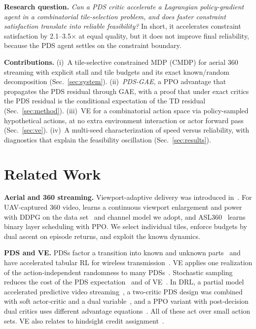 \documentclass[conference]{IEEEtran}
\begin{document}
\textbf{Research question.} \emph{Can a PDS critic accelerate a Lagrangian policy-gradient agent in a combinatorial tile-selection problem, and does faster constraint satisfaction translate into reliable feasibility?} In short, it accelerates constraint satisfaction by 2.1--3.5$\times$ at equal quality, but it does not improve final reliability, because the PDS agent settles on the constraint boundary.

\textbf{Contributions.}
(i)~A tile-selective constrained MDP (CMDP) for aerial 360\textdegree{} streaming with explicit stall and tile budgets and its exact known/random decomposition (Sec.~\ref{sec:system}).
(ii)~\emph{PDS-GAE}, a PPO advantage that propagates the PDS residual through GAE, with a proof that under exact critics the PDS residual is the conditional expectation of the TD residual (Sec.~\ref{sec:method}).
(iii)~VE for a combinatorial action space via policy-sampled hypothetical actions, at no extra environment interaction or actor forward pass (Sec.~\ref{sec:ve}).
(iv)~A multi-seed characterization of speed versus reliability, with diagnostics that explain the feasibility oscillation (Sec.~\ref{sec:results}).

\section{Related Work}

\textbf{Aerial and 360\textdegree{} streaming.} Viewport-adaptive delivery was introduced in~\cite{corbillon2017viewport}. For UAV-captured 360\textdegree{} video, \cite{chakareski2025mmsp} learns a continuous viewport enlargement and power with DDPG on the data set~\cite{chakareski2021dataset} and channel model we adopt, and ASL360~\cite{mohammadhosseini2025asl360} learns binary layer scheduling with PPO. We select individual tiles, enforce budgets by dual ascent on episode returns, and exploit the known dynamics.

\textbf{PDS and VE.} PDSs factor a transition into known and unknown parts~\cite{powell2011adp} and have accelerated tabular RL for wireless transmission~\cite{mastronarde2011fast,sharma2020accelerated}. VE applies one realization of the action-independent randomness to many PDSs~\cite{mastronarde2013joint,sharma2020accelerated}. Stochastic sampling reduces the cost of the PDS expectation~\cite{corra2025lowcomplexity} and of VE~\cite{mohammadhosseini2026stochastic}. In DRL, a partial model accelerated predictive video streaming~\cite{liu2021partial}, a two-critic PDS design was combined with soft actor-critic and a dual variable~\cite{lu2026resource}, and a PPO variant with post-decision dual critics uses different advantage equations~\cite{felizardo2025pdppo}. All of these act over small action sets. VE also relates to hindsight credit assignment~\cite{harutyunyan2019hindsight}.
\end{document}
